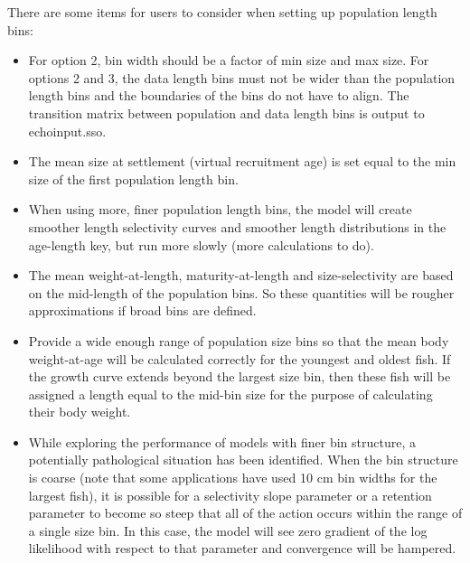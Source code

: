 There are some items for users to consider when setting up population length bins:
\begin{itemize}
	\item For option 2, bin width should be a factor of min size and max size.  For options 2 and 3, the data length bins must not be wider than the population length bins and the boundaries of the bins do not have to align.  The transition matrix between population and data length bins is output to echoinput.sso.
	
	\item The mean size at settlement (virtual recruitment age) is set equal to the min size of the first population length bin.
	
	\item When using more, finer population length bins, the model will create smoother length selectivity curves and smoother length distributions in the age-length key, but run more slowly (more calculations to do).
	
	\item The mean weight-at-length, maturity-at-length and size-selectivity are based on the mid-length of the population bins.  So these quantities will be rougher approximations if broad bins are defined.
	
	\item Provide a wide enough range of population size bins so that the mean body weight-at-age will be calculated correctly for the youngest and oldest fish.  If the growth curve extends beyond the largest size bin, then these fish will be assigned a length equal to the mid-bin size for the purpose of calculating their body weight.
	
	\item While exploring the performance of models with finer bin structure, a potentially pathological situation has been identified.  When the bin structure is coarse (note that some applications have used 10 cm bin widths for the largest fish), it is possible for a selectivity slope parameter or a retention parameter to become so steep that all of the action occurs within the range of a single size bin.  In this case, the model will see zero gradient of the log likelihood with respect to that parameter and convergence will be hampered.
	

\end{itemize}
